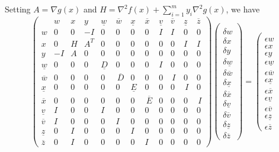 \documentclass[11pt,a4paper]{article}
\newcommand{\unl}[1]{{\ \!\underline{\;\!\!#1\;\!\!}\ \!}}
\renewcommand{\unl}[1]{{\underline{#1}}}
\newcommand{\ovl}[1]{{\bar{#1}}}
\renewcommand{\ovl}[1]{{\overline{#1}}}
\newcommand{\vl}{{\unl{v}}}
\newcommand{\wl}{{\unl{w}}}
\newcommand{\xl}{{\unl{x}}}
\newcommand{\zl}{{\unl{z}}}
\newcommand{\Dl}{{\underline{D\!}\,}}
\newcommand{\El}{{\underline{E\!}\,}}
\newcommand{\vu}{{\ovl{v}}}
\newcommand{\wu}{{\ovl{w}}}
\newcommand{\xu}{{\ovl{x}}}
\newcommand{\zu}{{\ovl{z}}}
\newcommand{\Du}{{\,\overline{\!D}}}
\newcommand{\Eu}{{\,\overline{\!E}}}
\newcommand{\w}{w}
\newcommand{\x}{x}
\newcommand{\y}{y}
\begin{document}
Setting $A=\nabla\!g(x)$ and $H=\nabla^2\!f(x)+\sum_{i=1}^{m} y_i \nabla^2 g(x)$, we have
{\small\begin{equation*}
\left( \begin{array}{c|ccc|cccc|cccc}
    & \w&\x&\y & \wl&\wu&\xl&\xu & \vl&\vu&\zl&\zu \\ \hline
  \w & 0 & 0 & -I  &  0&0&0&0 & I&I&0&0 \\
  \x & 0 & H & A^T  &  0&0&0&0 & 0&0&I&I \\
  \y & -I & A & 0  &  0&0&0&0 & 0&0&0&0 \\ \hline
  \wl & 0 & 0 & 0  &  \!\Dl\!\!\!&0&0&0 & I\,&0&0&0 \\
  \wu & 0 & 0 & 0  &  0&\!\!\!\Du\!\!\!&0&0 & 0&\,I\,&0&0 \\
  \xl & 0 & 0 & 0  &  0&0&\!\!\!\El\!\!\!&0 & 0&0&\,I\,&0 \\
  \xu & 0 & 0 & 0  &  0&0&0&\!\!\!\Eu\! & 0&0&0&\,I \\ \hline
  \vl & I & 0 & 0  &  I&0&0&0 & 0&0&0&0 \\
  \vu & I & 0 & 0  &  0&I&0&0 & 0&0&0&0 \\
  \zl & 0 & I & 0  &  0&0&I&0 & 0&0&0&0 \\
  \zu & 0 & I & 0  &  0&0&0&I & 0&0&0&0
\end{array}\right)
\left( \begin{array}{c} 
  \\\hline \delta\w\\\delta\x\\\delta\y \\\hline \delta\wl\\\delta\wu\\\delta\xl\\\delta\xu \\\hline \delta\vl\\\delta\vu\\\delta\zl\\\delta\zu 
\end{array}\right)
=
\left( \begin{array}{c} 
  \\\hline \epsilon\w\\\epsilon\x\\\epsilon\y \\\hline \epsilon\wl\\\epsilon\wu\\\epsilon\xl\\\epsilon\xu \\\hline \epsilon\vl\\\epsilon\vu\\\epsilon\zl\\\epsilon\zu 

\end{array}
\end{equation*}}
\end{document}
